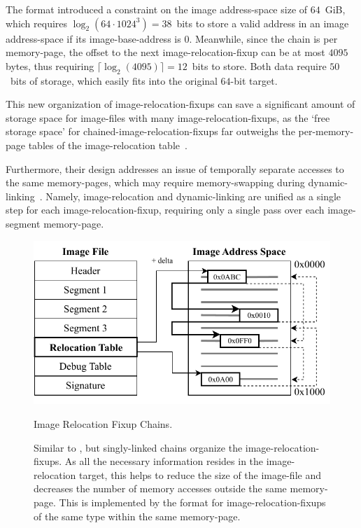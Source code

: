 The  format introduced a constraint on the \gls{image} \gls{address-space} size of $64$~GiB, which requires $\log_2(64 \cdot 1024^3) = 38$~bits to store a valid address in an \gls{image} \gls{address-space} if its \gls{image-base-address} is $0$. Meanwhile, since the chain is per \gls{memory-page}, the offset to the next \gls{image-relocation-fixup} can be at most $4095$ \glspl{byte}, thus requiring $\lceil \log_2(4095) \rceil = 12$~bits to store. Both data require $50$~bits of storage, which easily fits into the original $64$-bit target.

This new organization of \glspl{image-relocation-fixup} can save a significant amount of storage space for \glspl{image-file} with many \glspl{image-relocation-fixup}, as the `free storage space' for \gls{chained-image-relocation-fixups} far outweighs the per-\gls{memory-page} tables of the \gls{image-relocation} table~\cite{dyld_chains}.

Furthermore, their design addresses an issue of temporally separate accesses to the same \glspl{memory-page}, which may require \gls{memory-swapping} during \gls{dynamic-linking}~\cite{dyld_chains}. Namely, \gls{image-relocation} and \gls{dynamic-linking} are unified as a single step for each \gls{image-relocation-fixup}, requiring only a single pass over each \gls{image-segment} \gls{memory-page}.

\begin{figure}[htb]
  \centering
  \includegraphics{Figures/FixupChain.pdf}
  \caption{Image Relocation Fixup Chains.}
  \label{fig:fixup_chains}
  \caption*{Similar to , but singly-linked chains organize the \glspl{image-relocation-fixup}. As all the necessary information resides in the \gls{image-relocation} target, this helps to reduce the size of the \gls{image-file} and decreases the number of memory accesses outside the same \gls{memory-page}. This is implemented by the  format for \glspl{image-relocation-fixup} of the same type within the same \gls{memory-page}.}
\end{figure}


